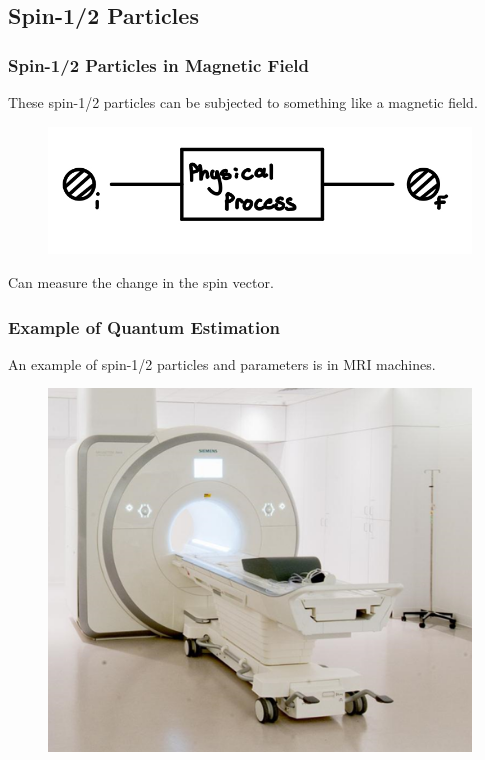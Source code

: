 \documentclass{beamer}
\begin{document}
\subsection{\tiny{Spin-1/2 Particles}}
\begin{frame}
\frametitle{Spin-1/2 Particles in Magnetic Field}
These spin-1/2 particles can be subjected to something like a magnetic field. 
\begin{figure}
\begin{center}
\includegraphics[width=0.75\linewidth]{Spin-12-In-Magnetic-Field.jpeg}
\end{center}
\end{figure}
Can measure the change in the spin vector.
\end{frame}
\begin{frame}
\frametitle{Example of Quantum Estimation}
An example of spin-1/2 particles and parameters is in MRI machines.
\begin{figure}
\begin{center}
\includegraphics[width=0.75\linewidth]{MRI-Machine.png}
\end{center}
\end{figure}
\end{frame}
\end{document}
